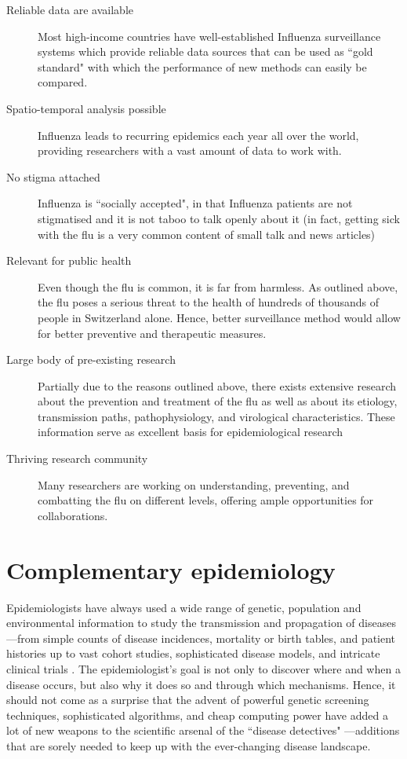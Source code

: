 \documentclass[11pt, a4paper,twoside]{report}\usepackage[]{graphicx}\usepackage[]{color}
\begin{document}
\begin{description}
\item [Reliable data are available] Most high-income countries have well-established Influenza surveillance systems which provide reliable data sources that can be used as ``gold standard" with which the performance of new methods can easily be compared.
\item [Spatio-temporal analysis possible] Influenza leads to recurring epidemics each year all over the world, providing researchers with a vast amount of data to work with.
\item [No stigma attached] Influenza is ``socially accepted", in that Influenza patients are not stigmatised and it is not taboo to talk openly about it (in fact, getting sick with the flu is a very common content of small talk and news articles)
\item [Relevant for public health ] Even though the flu is common, it is far from harmless. As outlined above, the flu poses a serious threat to the health of hundreds of thousands of people in Switzerland alone. Hence, better surveillance method would allow for better preventive and therapeutic measures.
\item [Large body of pre-existing research] Partially due to the reasons outlined above, there exists extensive research about the prevention and treatment of the flu as well as about its etiology, transmission paths, pathophysiology, and virological characteristics. These information serve as excellent basis for epidemiological research
\item [Thriving research community] Many researchers are working on understanding, preventing, and combatting the flu on different levels, offering ample opportunities for collaborations.
\end{description}

\section{Complementary epidemiology}
Epidemiologists have always used a wide range of genetic, population and environmental information to study the transmission and propagation of diseases---from simple counts of disease incidences, mortality or birth tables, and patient histories up to vast cohort studies, sophisticated disease models, and intricate clinical trials \citep{rothman2012epidemiology,koepsell2014epidemiologic}. The epidemiologist's goal is not only to discover where and when a disease occurs, but also why it does so and through which mechanisms. Hence, it should not come as a surprise that the advent of powerful genetic screening techniques, sophisticated algorithms, and cheap computing power have added a lot of new weapons to the scientific arsenal of the ``disease detectives" \citep{bailey2005introduction, khoury_transforming_2013, gardy_real-time_2015}---additions that are sorely needed to keep up with the ever-changing disease landscape.
\end{document}
